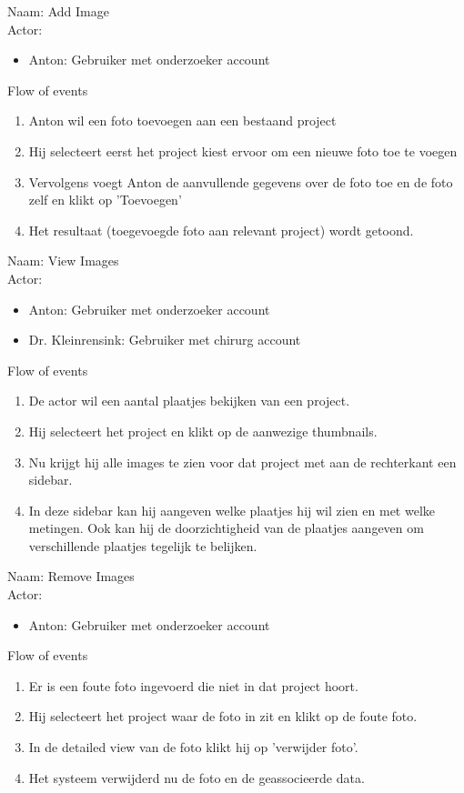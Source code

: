 \item   Naam: Add Image \\
	Actor:
	\begin{itemize}
		\item Anton: Gebruiker met onderzoeker account
	\end{itemize}
	Flow of events
	\begin{enumerate}
        \item Anton wil een foto toevoegen aan een bestaand project
				\item Hij selecteert eerst het project kiest ervoor om een nieuwe foto toe te voegen
				\item Vervolgens voegt Anton de aanvullende gegevens over de foto toe en de foto zelf en klikt op 'Toevoegen' 
				\item Het resultaat (toegevoegde foto aan relevant project) wordt getoond.
    \end{enumerate}


\item  Naam: View Images  \\
	Actor:
	\begin{itemize}
		\item Anton: Gebruiker met onderzoeker account
		\item Dr. Kleinrensink: Gebruiker met chirurg account
	\end{itemize}
	Flow of events
	\begin{enumerate}
		\item De actor wil een aantal plaatjes bekijken van een project.
		\item Hij selecteert het project en klikt op de aanwezige thumbnails.
		\item Nu krijgt hij alle images te zien voor dat project met aan de rechterkant een sidebar.
		\item In deze sidebar kan hij aangeven welke plaatjes hij wil zien en met welke metingen. Ook kan hij de doorzichtigheid van de plaatjes aangeven om verschillende plaatjes tegelijk te belijken.
	\end{enumerate}


\item   Naam: Remove Images \\
	Actor:
	\begin{itemize}
		\item Anton: Gebruiker met onderzoeker account
	\end{itemize}
	Flow of events
	\begin{enumerate}
		\item Er is een foute foto ingevoerd die niet in dat project hoort.
		\item Hij selecteert het project waar de foto in zit en klikt op de foute foto.
		\item In de detailed view van de foto klikt hij op 'verwijder foto'.
		\item Het systeem verwijderd nu de foto en de geassocieerde data.
	\end{enumerate}


